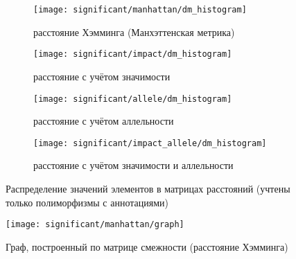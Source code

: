 \documentclass[main.tex]{subfiles}
\begin{document}
\begin{figure}[H]
    \centering
    \begin{subfigure}{.5\textwidth}
        \centering
        \texttt{[image: significant/manhattan/dm\_histogram]}
        \captionsetup{width=.8\linewidth}
        \caption{расстояние Хэмминга (Ман\-хэт\-тенская метрика)}
        \label{fig:hist_manh}
    \end{subfigure}%
    \begin{subfigure}{.5\textwidth}
        \centering
        \texttt{[image: significant/impact/dm\_histogram]}
        \captionsetup{width=.8\linewidth}
        \caption{расстояние с учётом значимости}
        \label{fig:hist_impact}
    \end{subfigure}

    \begin{subfigure}{.5\textwidth}
        \centering
        \texttt{[image: significant/allele/dm\_histogram]}
        \captionsetup{width=.8\linewidth}
        \caption{расстояние с учётом аллельности}
        \label{fig:hist_allele}
    \end{subfigure}%
    \begin{subfigure}{.5\textwidth}
        \centering
        \texttt{[image: significant/impact\_allele/dm\_histogram]}
        \captionsetup{width=.8\linewidth}
        \caption{расстояние с учётом значимости и аллельности}
        \label{fig:hist_impact_allele}
    \end{subfigure}
    \caption{Распределение значений элементов в матрицах расстояний (учтены только полиморфизмы с аннотациями)}
\end{figure}

\begin{figure}[H]
    \centering \texttt{[image: significant/manhattan/graph]}
    \caption{Граф, построенный по матрице смежности (расстояние Хэмминга)}
    \label{fig:signif_manhattan_graph}
\end{figure}
\end{document}
